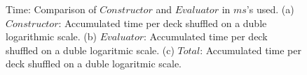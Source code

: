 \documentclass[twoside,11pt,openright]{report}
\begin{document}
\begin{figure}
    \begin{subfigure}{\textwidth}
        \centering
        \caption{}
        \label{fig:total_ms_plot}
    \end{subfigure}

    \caption{Time: Comparison of $Constructor$ and $Evaluator$ in $ms$'s used. (a) $Constructor$: Accumulated time per deck shuffled on a duble logarithmic scale. (b) $Evaluator$: Accumulated time per deck shuffled on a duble logaritmic scale. (c) $Total$: Accumulated time per deck shuffled on a duble logaritmic scale.}
    \label{fig:mesurement_ms}
\end{figure}
\end{document}
